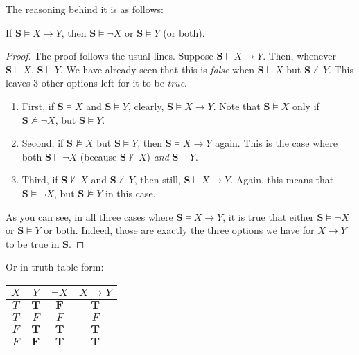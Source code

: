 The reasoning behind it is as follows:

\begin{prop}
If $\mathbf{S} \models X \rightarrow Y$, then $\mathbf{S} \models \neg X$ or $\mathbf{S} \models Y$ (or both). 
\end{prop}

\begin{proof}
The proof follows the usual lines. Suppose $\mathbf{S} \models X \rightarrow Y$. Then, whenever $\mathbf{S} \models X$, $\mathbf{S} \models Y$. We have already seen that this is \textit{false} when $\mathbf{S} \models X$ but $\mathbf{S} \not\models Y$. This leaves 3 other options left for it to be \textit{true}.

\begin{enumerate}
	\item First, if $\mathbf{S} \models X$ and $\mathbf{S}\models Y$, clearly, $\mathbf{S} \models X \rightarrow Y$. Note that $\mathbf{S} \models X$ only if $\mathbf{S} \not\models \neg X$, but $\mathbf{S} \models Y$.
	\item Second, if $\mathbf{S} \not\models X$ but $\mathbf{S} \models Y$, then $\mathbf{S}\models X \rightarrow Y$ again. This is the case where both $\mathbf{S} \models \neg X$ (because $\mathbf{S} \not\models X$) \textit{and} $\mathbf{S} \models Y$. 
	\item Third, if $\mathbf{S} \not\models X$ and $\mathbf{S} \not\models Y$, then still, $\mathbf{S} \models X \rightarrow Y$. Again, this means that $\mathbf{S} \models \neg X$, but $\mathbf{S} \not\models Y$ in this case. 
\end{enumerate} 

As you can see, in all three cases where $\mathbf{S} \models X \rightarrow Y$, it is true that either $\mathbf{S} \models \neg X$ or $\mathbf{S} \models Y$ or both. Indeed, those are exactly the three options we have for $X \rightarrow Y$ to be true in $\mathbf{S}$. 
\end{proof}

Or in truth table form:

\begin{center}
\begin{tabular}{c|c|c|c} 
	$X$ & $Y$ & $\neg X$ & $X \rightarrow Y$\\ \hline \rowcolor{lightgray}
	$T$ & $\mathbf{T}$ & $\mathbf{F}$ & $\mathbf{T}$\\
	$T$ & $F$ & $F$ & $F$\\\rowcolor{lightgray}
	$F$ & $\mathbf{T}$ & $\mathbf{T}$ & $\mathbf{T}$\\\rowcolor{lightgray}
	$F$ & $\mathbf{F}$ & $\mathbf{T}$ & $\mathbf{T}$
\end{tabular}
\end{center}

